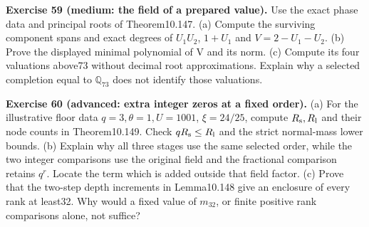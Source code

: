 \documentclass[
  11pt,
  a4paper,
]{article}
\begin{document}
\textbf{Exercise 59 (medium: the field of a prepared value).} Use the
exact phase data and principal roots of Theorem10.147. (a) Compute the
surviving component spans and exact degrees of \(U_1U_2\), \(1+U_1\) and
\(V=2-U_1-U_2\). (b) Prove the displayed minimal polynomial of V and its
norm. (c) Compute its four valuations above73 without decimal root
approximations. Explain why a selected completion equal to
\(\mathbb Q_{73}\) does not identify those valuations.

\textbf{Exercise 60 (advanced: extra integer zeros at a fixed order).}
(a) For the illustrative floor data \(q=3,\theta=1,U=1001\),
\(\xi=24/25\), compute \(R_{\rm s},R_{\rm l}\) and their node counts in
Theorem10.149. Check \(qR_{\rm s}\le R_{\rm l}\) and the strict
normal-mass lower bounds. (b) Explain why all three stages use the same
selected order, while the two integer comparisons use the original field
and the fractional comparison retains \(q^r\). Locate the term which is
added outside that field factor. (c) Prove that the two-step depth
increments in Lemma10.148 give an enclosure of every rank at least32.
Why would a fixed value of \(m_{32}\), or finite positive rank
comparisons alone, not suffice?
\end{document}
